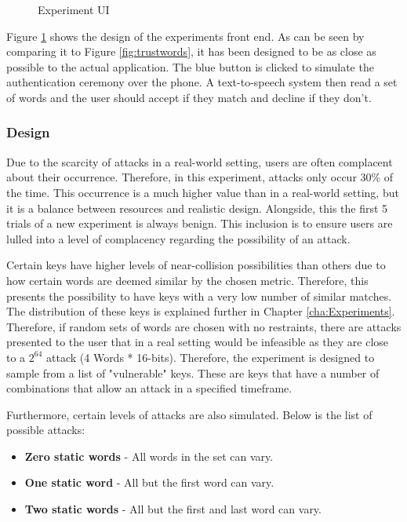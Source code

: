 \begin{figure}[h!]
    \centering
    \caption{Experiment UI}
    \label{fig:expID}
\end{figure}

Figure \ref{fig:expID} shows the design of the experiments front end. As can be seen by comparing it to Figure \ref{fig:trustwords}, it has been designed to be as close as possible to the actual application. The blue button is clicked to simulate the authentication ceremony over the phone. A text-to-speech system then read a set of words and the user should accept if they match and decline if they don't.

\subsubsection{Design}

Due to the scarcity of attacks in a real-world setting, users are often complacent about their occurrence. Therefore, in this experiment, attacks only occur 30\% of the time. This occurrence is a much higher value than in a real-world setting, but it is a balance between resources and realistic design. Alongside, this the first 5 trials of a new experiment is always benign. This inclusion is to ensure users are lulled into a level of complacency regarding the possibility of an attack.

Certain keys have higher levels of near-collision possibilities than others due to how certain words are deemed similar by the chosen metric. Therefore, this presents the possibility to have keys with a very low number of similar matches. The distribution of these keys is explained further in Chapter \ref{cha:Experiments}. Therefore, if random sets of words are chosen with no restraints, there are attacks presented to the user that in a real setting would be infeasible as they are close to a $2^{64}$ attack (4 Words * 16-bits). Therefore, the experiment is designed to sample from a list of "vulnerable" keys. These are keys that have a number of combinations that allow an attack in a specified timeframe. 

Furthermore, certain levels of attacks are also simulated. Below is the list of possible attacks:

\begin{itemize}
    \item \textbf{Zero static words} - All words in the set can vary.
    \item \textbf{One static word} - All but the first word can vary.
    \item \textbf{Two static words} - All but the first and last word can vary.
\end{itemize}

